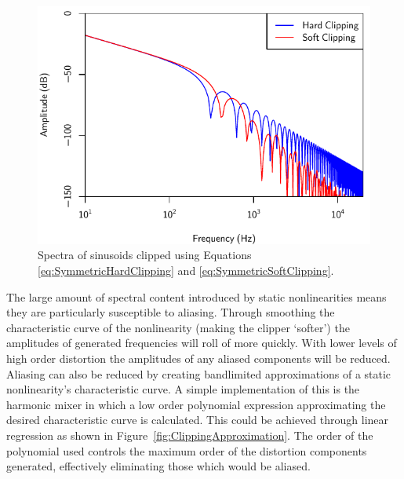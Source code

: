 			\begin{figure}[h!]
				\centering
				\includegraphics{chapter5/Images/ClippingSpectra.pdf}
				\caption{Spectra of sinusoids clipped using Equations \ref{eq:SymmetricHardClipping} and
			                 \ref{eq:SymmetricSoftClipping}.}
				\label{fig:ClippingSpectra}
			\end{figure}

			The large amount of spectral content introduced by static nonlinearities means they are
			particularly susceptible to aliasing. Through smoothing the characteristic curve of the
			nonlinearity (making the clipper `softer') the amplitudes of generated frequencies will roll of
			more quickly. With lower levels of high order distortion the amplitudes of any aliased components
			will be reduced. Aliasing can also be reduced by creating bandlimited approximations of a static
			nonlinearity's characteristic curve. A simple implementation of this is the harmonic mixer
			\citep{schattschneider1999discrete} in which a low order polynomial expression approximating the
			desired characteristic curve is calculated.  This could be achieved through linear regression as
			shown in Figure~\ref{fig:ClippingApproximation}. The order of the polynomial used controls the
			maximum order of the distortion components generated, effectively eliminating those which would be
			aliased.


